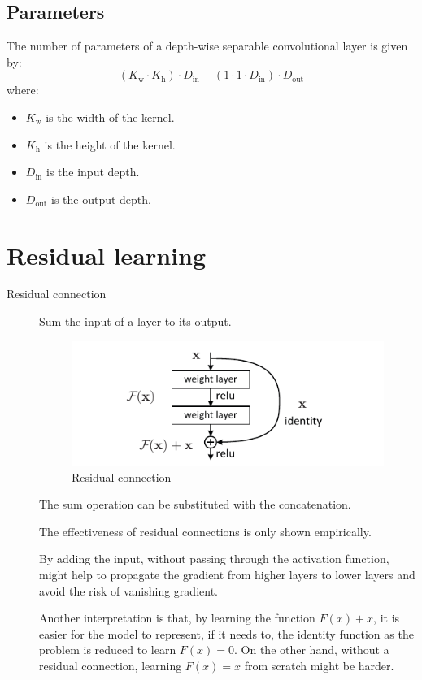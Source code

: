 \subsection{Parameters}

The number of parameters of a depth-wise separable convolutional layer is given by:
\[ (K_\text{w} \cdot K_\text{h}) \cdot D_\text{in} + (1 \cdot 1 \cdot D_\text{in}) \cdot D_\text{out} \]
where:
\begin{itemize}
    \item $K_\text{w}$ is the width of the kernel.
    \item $K_\text{h}$ is the height of the kernel.
    \item $D_\text{in}$ is the input depth.
    \item $D_\text{out}$ is the output depth.
\end{itemize}



\section{Residual learning}

\begin{description}
    \item[Residual connection] 
        Sum the input of a layer to its output.
        \begin{figure}[H]
            \centering
            \includegraphics[width=0.5\linewidth]{./img/_residual_connection.pdf}
            \caption{Residual connection}
        \end{figure}

        \begin{remark}
            The sum operation can be substituted with the concatenation.
        \end{remark}

        \begin{remark}
            The effectiveness of residual connections is only shown empirically.
        \end{remark}

        \begin{remark}
            By adding the input, without passing through the activation function,
            might help to propagate the gradient from higher layers to lower layers
            and avoid the risk of vanishing gradient.
            
            Another interpretation is that, by learning the function $F(x) + x$, it is easier for the model to represent, if it needs to, the identity function as 
            the problem is reduced to learn $F(x) = 0$.
            On the other hand, without a residual connection, learning $F(x) = x$ from scratch might be harder.
        \end{remark}
\end{description}



